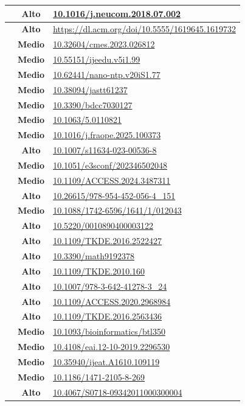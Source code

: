 \documentclass[11pt,a4paper]{article}
\begin{document}
\begin{longtable}{|c|c|p{9cm}|}
\hline
[19] & \textbf{Alto}  & \url{10.1016/j.neucom.2018.07.002} \\
\hline
[20] & \textbf{Alto}  & \url{https://dl.acm.org/doi/10.5555/1619645.1619732} \\
\hline
[21] & \textbf{Medio} & \url{10.32604/cmes.2023.026812} \\
\hline
[22] & \textbf{Medio} & \url{10.55151/ijeedu.v5i1.99} \\
\hline
[23] & \textbf{Medio} & \url{10.62441/nano-ntp.v20iS1.77} \\
\hline
[24] & \textbf{Medio} & \url{10.38094/jastt61237} \\
\hline
[25] & \textbf{Medio} & \url{10.3390/bdcc7030127} \\
\hline
[26] & \textbf{Medio} & \url{10.1063/5.0110821} \\
\hline
[27] & \textbf{Medio} & \url{10.1016/j.fraope.2025.100373} \\
\hline
[28] & \textbf{Alto}  & \url{10.1007/s11634-023-00536-8} \\
\hline
[29] & \textbf{Medio} & \url{10.1051/e3sconf/202346502048} \\
\hline
[30] & \textbf{Medio} & \url{10.1109/ACCESS.2024.3487311} \\
\hline
[31] & \textbf{Alto}  & \url{10.26615/978-954-452-056-4_151} \\
\hline
[32] & \textbf{Medio} & \url{10.1088/1742-6596/1641/1/012043} \\
\hline
[33] & \textbf{Alto}  & \url{10.5220/0010890400003122} \\
\hline
[34] & \textbf{Alto}  & \url{10.1109/TKDE.2016.2522427} \\
\hline
[35] & \textbf{Alto}  & \url{10.3390/math9192378} \\
\hline
[36] & \textbf{Alto}  & \url{10.1109/TKDE.2010.160} \\
\hline
[37] & \textbf{Alto}  & \url{10.1007/978-3-642-41278-3_24} \\
\hline
[38] & \textbf{Alto}  & \url{10.1109/ACCESS.2020.2968984} \\
\hline
[39] & \textbf{Alto}  & \url{10.1109/TKDE.2016.2563436} \\
\hline
[40] & \textbf{Medio} & \url{10.1093/bioinformatics/btl350} \\
\hline
[41] & \textbf{Medio} & \url{10.4108/eai.12-10-2019.2296530} \\
\hline
[42] & \textbf{Medio} & \url{10.35940/ijeat.A1610.109119} \\
\hline
[43] & \textbf{Medio} & \url{10.1186/1471-2105-8-269} \\
\hline
[44] & \textbf{Alto}  & \url{10.4067/S0718-09342011000300004} \\
\hline
\end{longtable}
\end{document}
